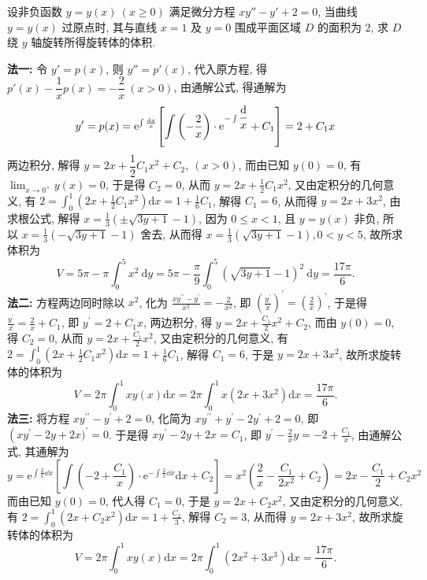 \begin{example}[2009 数二]
    设非负函数 $y=y(x)~(x\geqslant 0)$ 满足微分方程 $xy''-y'+2=0$, 当曲线 $y=y(x)$ 过原点时, 其与直线 $x=1$ 及 $y=0$ 围成平面区域 $D$ 的面积为 $2$, 求 $D$ 绕 $y$ 轴旋转所得旋转体的体积.
\end{example}
\begin{solution}
    \textbf{法一: }令 $y'=p(x)$, 则 $y''=p'(x)$, 代入原方程, 得 $p'(x)-\dfrac{1}{x}p(x)=-\dfrac{2}{x}~(x>0)$, 由通解公式, 得通解为
    $$y'=p(x)=\mathrm{e} ^{\int\frac{\dd x}{x}}\qty[\int\qty(-\dfrac{2}{x})\cdot\mathrm{e} ^{-\int\dfrac{\dd }{x}}+C_1]=2+C_1x$$
    两边积分, 解得 $y=2x+\dfrac{1}{2}C_1x^2+C_2,~(x>0)$, 而由已知 $ y(0)=0 $, 有 $\displaystyle  \lim _{x \to 0^{+}} y(x)=0 $, 于是得 $ C_{2}=0 $, 从而 $\displaystyle  y=2 x+\frac{1}{2} C_{1} x^{2} $, 又由定积分的几何意义, 有 $\displaystyle  2=\int_{0}^{1}\left(2 x+\frac{1}{2} C_{1} x^{2}\right) \mathrm{d} x=1+\frac{1}{6} C_{1} $, 解得 $ C_{1}=6 $, 从而得 $ y=2 x+3 x^{2} $, 由求根公式, 解得 $\displaystyle  x=\frac{1}{3}( \pm \sqrt{3 y+1}-1) $, 因为 $ 0 \leqslant x<1 $, 且 $ y=y(x) $ 非负, 所以 $\displaystyle  x=\frac{1}{3}(-\sqrt{3 y+1}-1) $ 舍去, 从而得 $\displaystyle  x=\frac{1}{3}(\sqrt{3 y+1}-1), 0<y<5 $, 故所求体积为 $$ V=5 \pi-\pi \int_{0}^{5} x^{2} \mathrm{~d} y=5 \pi-\frac{\pi}{9} \int_{0}^{5}(\sqrt{3 y+1}-1)^{2} \mathrm{~d} y=\frac{17 \pi}{6} .$$
    \textbf{法二: }方程两边同时除以 $ x^{2} $, 化为 $\displaystyle  \frac{x y^{\prime \prime}-y^{\prime}}{x^{2}}=-\frac{2}{x^{2}} $, 即 $\displaystyle  \left(\frac{y^{\prime}}{x}\right)^{\prime}=\left(\frac{2}{x}\right)^{\prime} $, 于是得 $\displaystyle  \frac{y^{\prime}}{x}=\frac{2}{x}+C_{1} $, 即 $ y^{\prime}=2+C_{1} x $, 两边积分, 得 $\displaystyle  y=2 x+\frac{C_{1}}{2} x^{2}+C_{2} $, 而由 $ y(0)=0 $, 得 $ C_{2}=0 $, 从而 $\displaystyle  y=2 x+\frac{C_{1}}{2} x^{2} $, 又由定积分的几何意义, 有 $\displaystyle  2=\int_{0}^{1}\left(2 x+\frac{1}{2} C_{1} x^{2}\right) \mathrm{d} x=1+\frac{1}{6} C_{1} $, 解得 $ C_{1}=6 $, 于是 $ y=2 x+3 x^{2} $, 故所求旋转体的体积为
    $$
        V=2 \pi \int_{0}^{1} x y(x) \mathrm{d} x=2 \pi \int_{0}^{1} x\left(2 x+3 x^{2}\right) \mathrm{d} x=\frac{17 \pi}{6} .
    $$
    \textbf{法三: }将方程 $ x y^{\prime \prime}-y^{\prime}+2=0 $, 化简为 $ x y^{\prime \prime}+y^{\prime}-2 y^{\prime}+2=0 $, 即 $ \left(x y^{\prime}-\right.   2 y+2 x)^{\prime}=0 $. 于是得 $ x y^{\prime}-2 y+2 x=C_{1} $, 即 $\displaystyle  y^{\prime}-\frac{2}{x} y=-2+\frac{C_{1}}{x} $, 由通解公式, 其通解为
    $$y=\mathrm{e}^{\int \frac{2}{x} \dd  x}\left[\int\left(-2+\frac{C_{1}}{x}\right) \cdot \mathrm{e}^{-\int \frac{2}{x} \dd  x} \mathrm{d} x+C_{2}\right]=x^{2}\left(\frac{2}{x}-\frac{C_{1}}{2 x^{2}}+C_{2}\right)=2 x-\frac{C_{1}}{2}+C_{2} x^{2} $$
    而由已知 $ y(0)=0 $, 代人得 $ C_{1}=0 $, 于是 $ y=2 x+C_{2} x^{2} $, 又由定积分的几何意义, 有 $\displaystyle  2=\int_{0}^{1}\left(2 x+C_{2} x^{2}\right) \mathrm{d} x=1+\frac{C_{2}}{3} $, 解得 $ C_{2}=3 $, 从而得 $ y=2 x+3 x^{2} $, 故所求旋转体的体积为
    $$V=2 \pi \int_{0}^{1} x y(x) \mathrm{d} x=2 \pi \int_{0}^{1}\left(2 x^{2}+3 x^{3}\right) \mathrm{d} x=\frac{17 \pi}{6} .$$
\end{solution}

